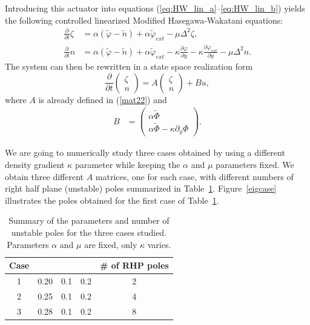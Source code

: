 \documentclass[12pt,lot, lof]{puthesis}
\begin{document}
Introducing this actuator into equations (\ref{eq:HW_lin_a}--\ref{eq:HW_lin_b}) yields the following controlled linearized Modified Hasegawa-Wakatani equations:
\begin{subequations}
\begin{align}
	\frac{\partial}{\partial t} \zeta &= \alpha (\tilde{\varphi}-\tilde{n}) +\alpha \tilde{\varphi}_{ext} - \mu \Delta^2 \zeta, \\
	\frac{\partial}{\partial t} n  &= \alpha (\tilde{\varphi}- \tilde{n}) +\alpha \tilde{\varphi}_{ext} -\kappa \frac{\partial \varphi}{\partial y}-\kappa \frac{\partial \varphi_{ext}}{\partial y}- \mu \Delta^2 n.
\end{align}
\end{subequations}
The system can then be rewritten in a state space realization form
%
\begin{equation}
	\frac{\partial}{\partial t} {\left( \begin{matrix} {\zeta} \\ {n} \end{matrix} \right)} =      A {\left( \begin{matrix} {\zeta} \\ {n} \end{matrix} \right)} + B u, 
\label{sy}
\end{equation}
where $A$ is already defined in (\ref{mat22})  and
%
\begin{align}
\label{init}
	B &= {\left( \begin{matrix} {\alpha \tilde{\Phi}} \\ {\alpha \tilde{\Phi} - \kappa \partial_y \Phi} \end{matrix} \right)} .
\end{align}

We are going to numerically study three cases obtained by using a different density gradient $\kappa$ parameter while keeping the $\alpha$ and $\mu$ parameters fixed. We obtain three different $A$ matrices, one for each case, with different numbers of right half plane (unstable) poles summarized in Table~\ref{Tabparameter1}.
Figure~\ref{eigcase} illustrates the poles obtained for the first case of Table~\ref{Tabparameter1}.


\begin{table}[htbp]
	\centering
	\caption{Summary of the parameters and number of unstable poles for the three cases studied.
		Parameters $\alpha$ and $\mu$ are fixed, only $\kappa$ varies.}
	\label{Tabparameter1}
	\begin{tabular}{ccccc} \\
		Case & \makebox[2.5em]{$\kappa$} & \makebox[2.5em]{$\alpha$}  & \makebox[2.5em]{$\mu$} & \# of RHP poles \\ \hline
		1 &0.20 &0.1   & 0.2 & 2  \\
		2 & 0.25&  0.1  & 0.2 & 4 \\
		3 & 0.28&   0.1 & 0.2 & 8  \\
	\end{tabular}
\end{table}
\end{document}
